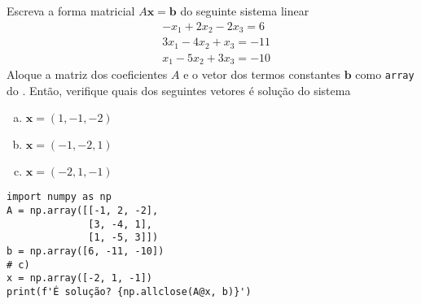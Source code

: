 \begin{exer}\label{cap_arr_sec_mat:exer:sislin}
  Escreva a forma matricial $A\pmb{x} = \pmb{b}$ do seguinte sistema linear
  \begin{subequations}
    \begin{align}
      &-x_1 + 2x_2 - 2x_3 = 6\\
      &3x_1 - 4x_2 + x_3 = -11\\
      &x_1 -5x_2 + 3x_3 = -10
    \end{align}
  \end{subequations}
  Aloque a matriz dos coeficientes $A$ e o vetor dos termos constantes $\pmb{b}$ como \lstinline+array+ do {\numpy}. Então, verifique quais dos seguintes vetores é solução do sistema
  \begin{enumerate}[a)]
  \item $\pmb{x} = (1, -1, -2)$
  \item $\pmb{x} = (-1, -2, 1)$
  \item $\pmb{x} = (-2, 1, -1)$
  \end{enumerate}
\end{exer}
\begin{resp}
\begin{lstlisting}
import numpy as np
A = np.array([[-1, 2, -2],
              [3, -4, 1],
              [1, -5, 3]])
b = np.array([6, -11, -10])
# c)
x = np.array([-2, 1, -1])
print(f'É solução? {np.allclose(A@x, b)}')
\end{lstlisting}
\end{resp}


